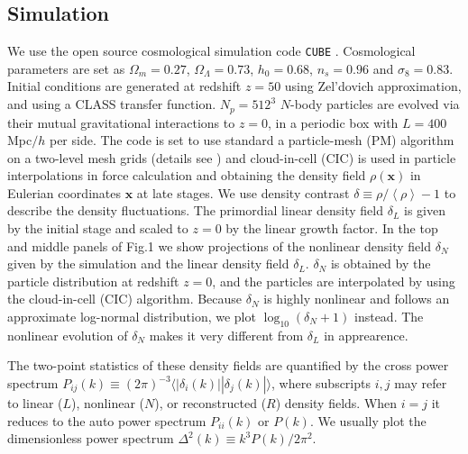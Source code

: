 \documentclass[aps,prd,twocolumn,superscriptaddress,amsfont,amssymb,amsmath,nofootinbib,showpacs,balancelastpage]{revtex4-1}
\newcommand{\bs}{\boldsymbol}
\newcommand{\lb}{\left\langle}
\newcommand{\rb}{\right\rangle}
\begin{document}
\subsection{Simulation}\label{ss.sim}
We use the open source cosmological simulation code {\tt CUBE} %
\citep{cafcube}.
Cosmological parameters are set as
$\Omega_m=0.27$, $\Omega_\Lambda=0.73$, $h_0=0.68$, $n_s=0.96$ and $\sigma_8=0.83$.
Initial conditions are generated at redshift $z=50$ 
using Zel'dovich approximation, and using a CLASS transfer function.
$N_p=512^3$ $N$-body particles are evolved via 
their mutual gravitational interactions to $z=0$, in a periodic box with $L=400$ 
Mpc$/h$ per side. The code is set to use standard a particle-mesh (PM) algorithm 
\cite{1988csup.book.....H} on a two-level mesh grids
(details see \cite{2013MNRAS.436..540H}) and cloud-in-cell
(CIC) is used in particle interpolations in force 
calculation and obtaining the density field $\rho({\bs x})$ in Eulerian coordinates 
${\bs x}$ at late stages. We use density contrast $\delta\equiv\rho/\lb\rho\rb-1$ 
to describe the density fluctuations. The primordial linear density field $
\delta_L$ is given by the initial stage and scaled to $z=0$ by the linear growth 
factor. In the top and middle panels of Fig.1 we show projections of the nonlinear density field
$\delta_N$ given by the simulation and the linear density field $\delta_L$.
$\delta_N$ is obtained by the particle distribution at redshift $z=0$, and
the particles are interpolated by using the cloud-in-cell (CIC) algorithm.
Because $\delta_N$ is highly nonlinear and follows an approximate
log-normal distribution, we plot $\log_{10}(\delta_N+1)$ instead.
The nonlinear evolution of $\delta_N$ makes it very different from $\delta_L$
in apprearence.

The two-point statistics of these density fields are quantified by the cross power 
spectrum $P_{ij}(k)\equiv(2\pi)^{-3}\langle|\delta_i(k)||\delta_j(k)|\rangle$, 
where subscripts $i,j$ may refer to linear ($L$), nonlinear ($N$), or reconstructed ($R$) density 
fields. When $i=j$ it reduces to the auto power spectrum $P_{ii}(k)$ or $P(k)$. We 
usually plot the dimensionless power spectrum $\Delta^2(k)\equiv k^3P(k)/2\pi^2$. 
\end{document}
